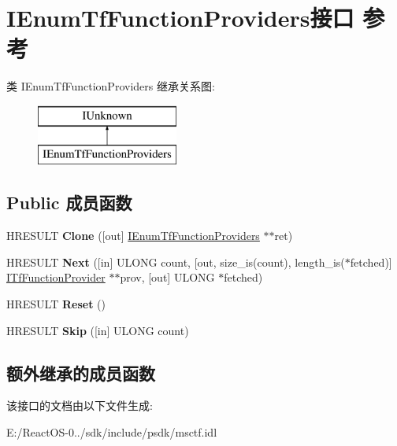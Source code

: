 \hypertarget{interface_i_enum_tf_function_providers}{}\section{I\+Enum\+Tf\+Function\+Providers接口 参考}
\label{interface_i_enum_tf_function_providers}
类 I\+Enum\+Tf\+Function\+Providers 继承关系图\+:\begin{figure}[H]
\begin{center}
\leavevmode
\includegraphics[height=2.000000cm]{interface_i_enum_tf_function_providers}
\end{center}
\end{figure}
\subsection*{Public 成员函数}
\begin{DoxyCompactItemize}
\item 
\mbox{\label{interface_i_enum_tf_function_providers_ad34d837e5893666b7eaff171a5d80f59}} 
H\+R\+E\+S\+U\+LT {\bfseries Clone} (\mbox{[}out\mbox{]} \hyperlink{interface_i_enum_tf_function_providers}{I\+Enum\+Tf\+Function\+Providers} $\ast$$\ast$ret)
\item 
\mbox{\label{interface_i_enum_tf_function_providers_a1117d935235884665d763f09afac4c95}} 
H\+R\+E\+S\+U\+LT {\bfseries Next} (\mbox{[}in\mbox{]} U\+L\+O\+NG count, \mbox{[}out, size\+\_\+is(count), length\+\_\+is($\ast$fetched)\mbox{]} \hyperlink{interface_i_tf_function_provider}{I\+Tf\+Function\+Provider} $\ast$$\ast$prov, \mbox{[}out\mbox{]} U\+L\+O\+NG $\ast$fetched)
\item 
\mbox{\label{interface_i_enum_tf_function_providers_a25a16b301e878fb2c4cb243bf7cd39da}} 
H\+R\+E\+S\+U\+LT {\bfseries Reset} ()
\item 
\mbox{\label{interface_i_enum_tf_function_providers_a288245dc31187eccf9c4cca2e73ae0bb}} 
H\+R\+E\+S\+U\+LT {\bfseries Skip} (\mbox{[}in\mbox{]} U\+L\+O\+NG count)
\end{DoxyCompactItemize}
\subsection*{额外继承的成员函数}


该接口的文档由以下文件生成\+:\begin{DoxyCompactItemize}
\item 
E\+:/\+React\+O\+S-\/0../sdk/include/psdk/msctf.\+idl\end{DoxyCompactItemize}
